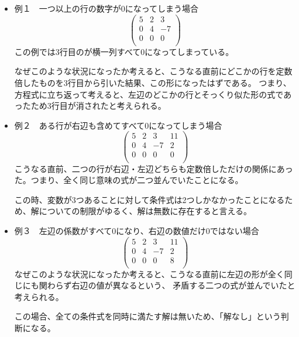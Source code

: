 \documentclass[]{ltjsarticle}%
\begin{document}
\begin{itemize}
  \item 例１　一つ以上の行の数字が0になってしまう場合
        \begin{equation}
          \label{eq:eq4}
          \left(
          \begin{array}{rrr}
              5 & 2 & 3  \\
              0 & 4 & -7 \\
              0 & 0 & 0  \\
            \end{array}
          \right)
        \end{equation}
        この例では3行目のが横一列すべて0になってしまっている。

        なぜこのような状況になったか考えると、こうなる直前にどこかの行を定数倍したものを3行目から引いた結果、この形になったはずである。
        つまり、方程式に立ち返って考えると、左辺のどこかの行とそっくり似た形の式であったため3行目が消されたと考えられる。


  \item 例２　ある行が右辺も含めてすべて0になってしまう場合
        \begin{equation}
          \label{eq:eq5}
          \left(
          \begin{array}{rrr|r}
              5 & 2 & 3  & 11 \\
              0 & 4 & -7 & 2  \\
              0 & 0 & 0  & 0  \\
            \end{array}
          \right)
        \end{equation}
        こうなる直前、二つの行が右辺・左辺どちらも定数倍しただけの関係にあった。つまり、全く同じ意味の式が二つ並んでいたことになる。

        この時、変数が3つあることに対して条件式は2つしかなかったことになるため、解についての制限がゆるく、解は無数に存在すると言える。


  \item 例３　左辺の係数がすべて0になり、右辺の数値だけ0ではない場合
        \begin{equation}
          \label{eq:eq6}
          \left(
          \begin{array}{rrr|r}
              5 & 2 & 3  & 11 \\
              0 & 4 & -7 & 2  \\
              0 & 0 & 0  & 8  \\
            \end{array}
          \right)
        \end{equation}
        なぜこのような状況になったか考えると、こうなる直前に左辺の形が全く同じにも関わらず右辺の値が異なるという、
        矛盾する二つの式が並んでいたと考えられる。

        この場合、全ての条件式を同時に満たす解は無いため、「解なし」という判断になる。
\end{itemize}
\end{document}

